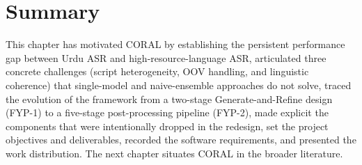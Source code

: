 \section{Summary}
\label{sec:ch1-summary}

This chapter has motivated CORAL by establishing the persistent performance gap between Urdu ASR and high-resource-language ASR, articulated three concrete challenges (script heterogeneity, OOV handling, and linguistic coherence) that single-model and naive-ensemble approaches do not solve, traced the evolution of the framework from a two-stage Generate-and-Refine design (FYP-1) to a five-stage post-processing pipeline (FYP-2), made explicit the components that were intentionally dropped in the redesign, set the project objectives and deliverables, recorded the software requirements, and presented the work distribution. The next chapter situates CORAL in the broader literature.
